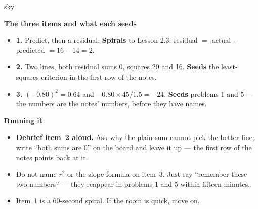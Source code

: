\documentclass[10pt]{article}
\begin{document}
\boxguard[20]
\begin{skillbox}{sky}
\begin{minipage}[t]{0.48\linewidth}
    \textbf{The three items and what each seeds}
    \begin{itemize}
        \item \textbf{1.} Predict, then a residual. \textbf{Spirals} to Lesson 2.3: residual
              $=$ actual $-$ predicted $= 16 - 14 = 2$.
        \item \textbf{2.} Two lines, both residual sums 0, squares 20 and 16. \textbf{Seeds} the
              least-squares criterion in the first row of the notes.
        \item \textbf{3.} $(-0.80)^2 = 0.64$ and $-0.80 \times 45/1.5 = -24$. \textbf{Seeds}
              problems 1 and 5 --- the numbers are the notes' numbers, before they have names.
    \end{itemize}
\end{minipage}
\hfill
\begin{minipage}[t]{0.48\linewidth}
    \textbf{Running it}
    \begin{itemize}
        \item \textbf{Debrief item~2 aloud.} Ask why the plain sum cannot pick the better
              line; write ``both sums are 0'' on the board and leave it up --- the first row
              of the notes points back at it.
        \item Do not name $r^2$ or the slope formula on item~3. Just say ``remember these two
              numbers'' --- they reappear in problems 1 and 5 within fifteen minutes.
        \item Item~1 is a 60-second spiral. If the room is quick, move on.
    \end{itemize}
\end{minipage}
\end{skillbox}
\end{document}
